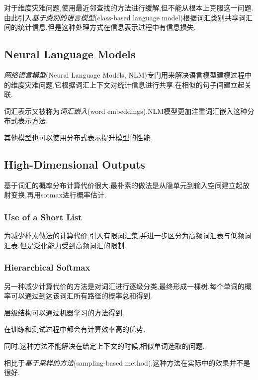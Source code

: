 对于维度灾难问题,使用最近邻查找的方法进行缓解,但不能从根本上克服这一问题.由此引入\textit{基于类别的语言模型}(class-based language model)根据词汇类别共享词汇间的统计信息.但是这种处理方式在信息表示过程中有信息损失.

\subsection{Neural Language Models}

\textit{网络语言模型}(Neural Language Models, NLM)专门用来解决语言模型建模过程中的维度灾难问题.它根据词汇上下文对统计信息进行共享.在相似的句子间建立起关联.

词汇表示又被称为\textit{词汇嵌入}(word embeddings).NLM模型更加注重词汇嵌入这种分布式表示方法.

其他模型也可以使用分布式表示提升模型的性能.

\subsection{High-Dimensional Outputs}

基于词汇的概率分布计算代价很大.最朴素的做法是从隐单元到输入空间建立起放射变换,再用sotmax进行概率估计.

\subsubsection{Use of a Short List}

为减少朴素做法的计算代价,引入有限词汇集,并进一步区分为高频词汇表与低频词汇表.但是泛化能力受到高频词汇的限制.

\subsubsection{Hierarchical Softmax}

另一种减少计算代价的方法是对词汇进行逐级分类,最终形成一棵树.每个单词的概率可以通过到达该词汇所有路径的概率总和得到.

层级结构可以通过机器学习的方法得到.

在训练和测试过程中都会有计算效率高的优势.

同时,这种方法不能解决在给定上下文的时候,相似单词选取的问题.

相比于\textit{基于采样的方法}(sampling-based method),这种方法在实际中的效果并不是很好.